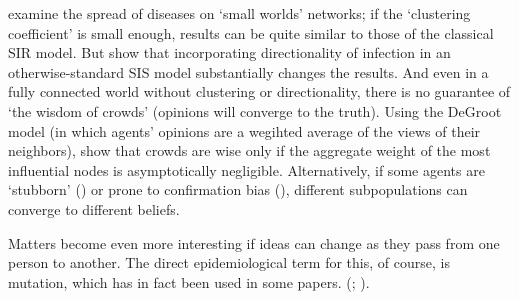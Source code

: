 




\cite{moore2000epidemics} examine the spread of diseases on `small worlds' networks; if the `clustering coefficient' is small enough, results can be quite similar to those of the classical SIR model.  But \cite{allard2020role}  show that incorporating directionality of infection in an otherwise-standard SIS model substantially changes the results.  And even in a fully connected world without clustering or directionality, there is no guarantee of `the wisdom of crowds' (opinions will converge to the truth).  Using the DeGroot model \cite{degroot1974reaching} (in which agents' opinions are a wegihted average of the views of their neighbors), \cite{golub2010naive} show that crowds are wise only if the aggregate weight of the most influential nodes is asymptotically negligible.  Alternatively, if some agents are `stubborn' (\cite{acemouglu2013opinion}) or prone to confirmation bias (\cite{sikder2020minimalistic}), different subpopulations can converge to different beliefs.

Matters become even more interesting if ideas can change as they pass from one person to another.  The direct epidemiological term for this, of course, is mutation, which has in fact been used in some papers.  (\cite{shiller2020popular}; \cite{hanchen_inflation_2017}).

